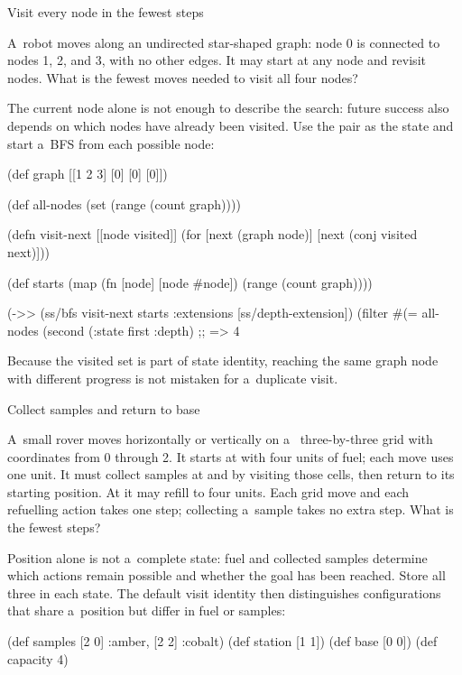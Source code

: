 {{\secc Visit every node in the fewest steps

 A~robot moves along an undirected star-shaped graph:
node 0 is connected to nodes 1, 2, and 3, with no other edges. It may start
at any node and revisit nodes. What is the fewest moves needed to visit all
four nodes?

\smallskip
{} The current node alone is not enough to describe
the search: future success also depends on which nodes have already been
visited. Use the pair  as the state and start a~BFS
from each possible node:

\begtt {}
(def graph [[1 2 3]
            [0]
            [0]
            [0]])

(def all-nodes (set (range (count graph))))

(defn visit-next [[node visited]]
  (for [next (graph node)]
    [next (conj visited next)]))

(def starts
  (map (fn [node] [node #{node}])
       (range (count graph))))

(->> (ss/bfs visit-next starts
                 {:extensions [ss/depth-extension]})
     (filter #(= all-nodes (second (:state %
     first
     :depth)
;; => 4
\endtt

Because the visited set is part of state identity, reaching the same graph
node with different progress is not mistaken for a~duplicate visit.

\secc Collect samples and return to base

 A~small rover moves horizontally or vertically on a~
three-by-three grid with coordinates from 0 through 2. It starts at
\code{[0 0]} with four units of fuel; each move uses one unit. It must
collect samples at \code{[2 0]} and \code{[2 2]} by visiting those cells,
then return to its starting position. At \code{[1 1]} it may refill to four
units. Each grid move and each refuelling action takes one step; collecting
a~sample takes no extra step. What is the fewest steps?

\smallskip
{} Position alone is not a~complete state: fuel and
collected samples determine which actions remain possible and whether the
goal has been reached. Store all three in each state. The default visit
identity then distinguishes configurations that share a~position but differ
in fuel or samples:

\begtt {}
(def samples {[2 0] :amber, [2 2] :cobalt})
(def station [1 1])
(def base [0 0])
(def capacity 4)

}}
